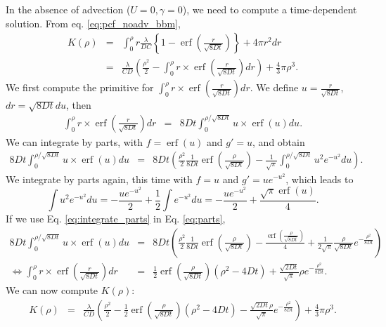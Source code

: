 \documentclass[12pt,english]{article}
\DeclareMathOperator\erf{erf}
\begin{document}
In the absence of advection ($U=0,\gamma=0$), we need to compute
a time-dependent solution. From eq. \ref{eq:pcf_noadv_bbm}, 
\begin{equation}
\begin{array}{ccc}
K(\rho) & = & \int_{0}^{\rho}r \frac{\lambda}{DC} \left\{ 1-\erf\left(\frac{r}{\sqrt{8Dt}}\right)\right\} +4\pi r^{2}dr\\
 & = & \frac{\lambda}{CD}\left(\frac{\rho^{2}}{2}-\int_{0}^{\rho}r\times\erf\left(\frac{r}{\sqrt{8Dt}}\right)dr\right)+\frac{4}{3}\pi\rho^{3}.
\end{array}\label{eq:start_K_intra_no_adv}
\end{equation}
We first compute the primitive for $\int_{0}^{\rho}r\times\erf\left(\frac{r}{\sqrt{8Dt}}\right)dr$.
We define $u=\frac{r}{\sqrt{8Dt}}$, $dr=\sqrt{8Dt}du$, then 
\begin{equation}
\begin{array}{ccc}
\int_{0}^{\rho}r\times\erf\left(\frac{r}{\sqrt{8Dt}}\right)dr & = & 8Dt\int_{0}^{\rho/\sqrt{8Dt}}u\times\erf\left(u\right)du.\end{array}
\end{equation}
We can integrate by parts, with $f=\erf(u)$ and $g'=u$, and obtain
\begin{equation}
\begin{array}{ccc}
8Dt\int_{0}^{\rho/\sqrt{8Dt}}u\times\erf\left(u\right)du & = & 8Dt\left(\frac{\rho^{2}}{2}\frac{1}{8Dt}\erf(\frac{\rho}{\sqrt{8Dt}})-\frac{1}{\sqrt{\pi}}\int_{0}^{\rho/\sqrt{8Dt}}u^{2}e^{-u^{2}}du\right).\end{array}\label{eq:parts}
\end{equation}
We integrate by parts again, this time with $f=u$ and $g'=ue^{-u^{2}}$,
which leads to 
\begin{equation}
\int u^{2}e^{-u^{2}}du=-\frac{ue^{-u^{2}}}{2}+\frac{1}{2}\int e^{-u^{2}}du=-\frac{ue^{-u^{2}}}{2}+\frac{\sqrt{\pi}\erf(u)}{4}.\label{eq:integrate_parts}
\end{equation}
If we use Eq. \ref{eq:integrate_parts} in Eq. \ref{eq:parts}, 
\begin{equation}
\begin{array}{ccc}
8Dt\int_{0}^{\rho/\sqrt{8Dt}}u\times\erf\left(u\right)du & = & 8Dt\left(\frac{\rho^{2}}{2}\frac{1}{8Dt}\erf(\frac{\rho}{\sqrt{8Dt}})-\frac{\erf(\frac{\rho}{\sqrt{8Dt}})}{4}+\frac{1}{2\sqrt{\pi}}\frac{\rho}{\sqrt{8Dt}}e^{-\frac{\rho^{2}}{8Dt}}\right)\\
\Leftrightarrow\int_{0}^{\rho}r\times\erf\left(\frac{r}{\sqrt{8Dt}}\right)dr & = & \frac{1}{2}\erf(\frac{\rho}{\sqrt{8Dt}})(\rho^{2}-4Dt)+\frac{\sqrt{2Dt}}{\sqrt{\pi}}\rho e^{-\frac{\rho^{2}}{8Dt}}.
\end{array}
\end{equation}
We can now compute $K(\rho)$: 
\begin{equation}
\begin{array}{ccc}
K(\rho) & = & \frac{\lambda}{CD}\left(\frac{\rho^{2}}{2}-\frac{1}{2}\erf(\frac{\rho}{\sqrt{8Dt}})(\rho^{2}-4Dt)-\frac{\sqrt{2Dt}\rho}{\sqrt{\pi}}e^{-\frac{\rho^{2}}{8Dt}}\right)+\frac{4}{3}\pi\rho^{3}.\end{array}\label{eq:end_K}
\end{equation}

 

\end{document}
